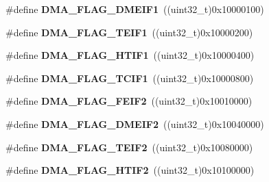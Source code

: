 \begin{DoxyCompactItemize}
\item 
\hypertarget{group___d_m_a__flags__definition_ga1f52407d92d389200727d1731ed2bf41}{\#define {\bfseries D\-M\-A\-\_\-\-F\-L\-A\-G\-\_\-\-D\-M\-E\-I\-F1}~((uint32\-\_\-t)0x10000100)}\label{group___d_m_a__flags__definition_ga1f52407d92d389200727d1731ed2bf41}

\item 
\hypertarget{group___d_m_a__flags__definition_gaebca425399650686931b35d650ec9872}{\#define {\bfseries D\-M\-A\-\_\-\-F\-L\-A\-G\-\_\-\-T\-E\-I\-F1}~((uint32\-\_\-t)0x10000200)}\label{group___d_m_a__flags__definition_gaebca425399650686931b35d650ec9872}

\item 
\hypertarget{group___d_m_a__flags__definition_ga5e00b692cb6654c1e09f091e4dba807c}{\#define {\bfseries D\-M\-A\-\_\-\-F\-L\-A\-G\-\_\-\-H\-T\-I\-F1}~((uint32\-\_\-t)0x10000400)}\label{group___d_m_a__flags__definition_ga5e00b692cb6654c1e09f091e4dba807c}

\item 
\hypertarget{group___d_m_a__flags__definition_ga4ec37900b79b667829eced7b442f2c9d}{\#define {\bfseries D\-M\-A\-\_\-\-F\-L\-A\-G\-\_\-\-T\-C\-I\-F1}~((uint32\-\_\-t)0x10000800)}\label{group___d_m_a__flags__definition_ga4ec37900b79b667829eced7b442f2c9d}

\item 
\hypertarget{group___d_m_a__flags__definition_ga3e7dfaf220ad350a2b0a3d307ba8896e}{\#define {\bfseries D\-M\-A\-\_\-\-F\-L\-A\-G\-\_\-\-F\-E\-I\-F2}~((uint32\-\_\-t)0x10010000)}\label{group___d_m_a__flags__definition_ga3e7dfaf220ad350a2b0a3d307ba8896e}

\item 
\hypertarget{group___d_m_a__flags__definition_ga69b110e9d83d45faf6e88719cff8f721}{\#define {\bfseries D\-M\-A\-\_\-\-F\-L\-A\-G\-\_\-\-D\-M\-E\-I\-F2}~((uint32\-\_\-t)0x10040000)}\label{group___d_m_a__flags__definition_ga69b110e9d83d45faf6e88719cff8f721}

\item 
\hypertarget{group___d_m_a__flags__definition_gaa3e1e5d2a043496524107ecc1ddfe934}{\#define {\bfseries D\-M\-A\-\_\-\-F\-L\-A\-G\-\_\-\-T\-E\-I\-F2}~((uint32\-\_\-t)0x10080000)}\label{group___d_m_a__flags__definition_gaa3e1e5d2a043496524107ecc1ddfe934}

\item 
\hypertarget{group___d_m_a__flags__definition_gae960d87b7770ec11820df758fecf28db}{\#define {\bfseries D\-M\-A\-\_\-\-F\-L\-A\-G\-\_\-\-H\-T\-I\-F2}~((uint32\-\_\-t)0x10100000)}\label{group___d_m_a__flags__definition_gae960d87b7770ec11820df758fecf28db}


\end{DoxyCompactItemize}
